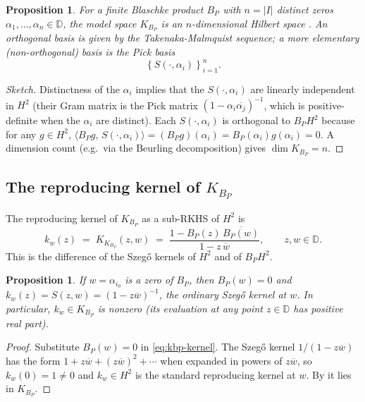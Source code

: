 \documentclass[11pt]{article}
\theoremstyle{plain}
\newtheorem{proposition}[theorem]{Proposition}
\theoremstyle{definition}
\theoremstyle{remark}
\newcommand{\HtH}{H^{2}}
\newcommand{\KBp}{K_{B_{P}}}
\newcommand{\D}{\mathbb{D}}
\newcommand{\inn}[2]{\langle #1,\, #2 \rangle}
\newcommand{\conj}[1]{\overline{#1}}
\newcommand{\Set}[1]{\left\{ #1 \right\}}
\begin{document}
\begin{proposition}\label{prop:kbp-dim}
For a finite Blaschke product $B_{P}$ with $n=|I|$ distinct zeros
$\alpha_{1},\dots,\alpha_{n}\in\D$, the model space $\KBp$ is an $n$-dimensional
Hilbert space \cite{garcia-mashreghi-ross}.  An orthogonal basis is given by
the Takenaka-Malmquist sequence; a more elementary (non-orthogonal) basis is
the Pick basis
\begin{equation}\label{eq:pick-basis}
  \Set{S(\cdot,\alpha_{i})}_{i=1}^{n}.
\end{equation}
\end{proposition}

\begin{proof}[Sketch]
Distinctness of the $\alpha_{i}$ implies that the $S(\cdot,\alpha_{i})$ are
linearly independent in $\HtH$ (their Gram matrix is the Pick matrix
$(1-\alpha_{i}\conj{\alpha_{j}})^{-1}$, which is positive-definite when the
$\alpha_{i}$ are distinct).  Each $S(\cdot,\alpha_{i})$ is orthogonal to
$B_{P}\HtH$ because for any $g\in\HtH$,
\(\inn{B_{P}g}{S(\cdot,\alpha_{i})} = (B_{P}g)(\alpha_{i})
   = B_{P}(\alpha_{i}) g(\alpha_{i}) = 0\).
A dimension count (e.g.\ via the Beurling decomposition) gives
$\dim\KBp = n$.
\end{proof}

\subsection{The reproducing kernel of \(\KBp\)}

The reproducing kernel of $\KBp$ as a sub-RKHS of $\HtH$ is
\begin{equation}\label{eq:kbp-kernel}
  k_{w}(z) \;=\; K_{\KBp}(z,w) \;=\;
   \frac{1 - B_{P}(z)\,\conj{B_{P}(w)}}{1 - z\,\conj{w}},
   \qquad z,w\in\D.
\end{equation}
This is the difference of the Szegő kernels of $\HtH$ and of $B_{P}\HtH$.

\begin{proposition}\label{prop:kw-at-zero}
If $w=\alpha_{i_{0}}$ is a zero of $B_{P}$, then $B_{P}(w)=0$ and
$k_{w}(z) = S(z,w) = (1-z\conj{w})^{-1}$, the ordinary Szegő kernel at $w$.
In particular, $k_{w}\in\KBp$ is nonzero (its evaluation at any point
$z\in\D$ has positive real part).
\end{proposition}

\begin{proof}
Substitute $B_{P}(w)=0$ in \eqref{eq:kbp-kernel}.  The Szegő kernel
$1/(1-z\conj{w})$ has the form $1+z\conj{w}+(z\conj{w})^{2}+\cdots$ when
expanded in powers of $z\conj{w}$, so $k_{w}(0)=1\ne 0$ and
$k_{w}\in\HtH$ is the standard reproducing kernel at $w$.  By
 it lies in $\KBp$.
\end{proof}
\end{document}
